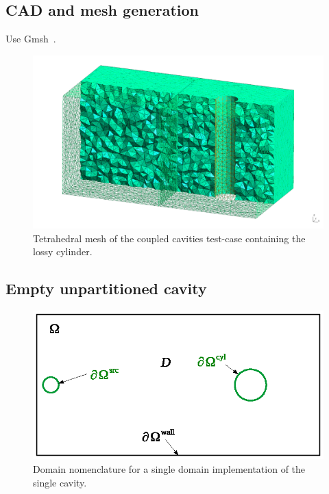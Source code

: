 \documentclass[a4paper]{article}
\numberwithin{equation}{section}
\begin{document}
\subsection[CAD and mesh generation]{CAD and mesh generation}
\label{sc:tcs:cadmesh}

Use Gmsh~\citep{Geuzaine2009}.

\begin{figure}[ht]
\begin{center}
\includegraphics[width=0.8\linewidth]{figures/gmshdualmesh}
\vspace{-4mm}
\caption{\label{fg:tcdualmesh} Tetrahedral mesh of the coupled cavities test-case containing the lossy cylinder.}
\end{center}
\end{figure}

\subsection[Empty unpartitioned cavity]{Empty unpartitioned cavity}
\label{sc:tcs:emptyunpart}

\begin{figure}[ht]
\begin{center}
\includegraphics[width=0.6\linewidth]{figures/domains0}
\vspace{-4mm}
\caption{\label{fg:tcdom0} Domain nomenclature for a single domain implementation of the single cavity.}
\end{center}
\end{figure}
\end{document}
